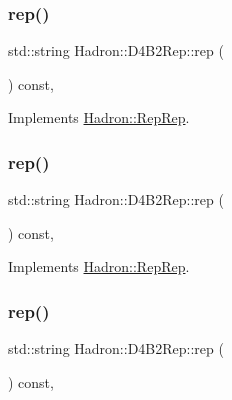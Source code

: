 \subsubsection{\texorpdfstring{rep()}{rep()}\hspace{0.1cm}{\footnotesize\ttfamily [3/5]}}
{\footnotesize\ttfamily std\+::string Hadron\+::\+D4\+B2\+Rep\+::rep (\begin{DoxyParamCaption}{ }\end{DoxyParamCaption}) const\hspace{0.3cm}{\ttfamily [inline]}, {\ttfamily [virtual]}}



Implements \mbox{\hyperlink{structHadron_1_1RepRep_ab3213025f6de249f7095892109575fde}{Hadron\+::\+Rep\+Rep}}.

\mbox{\label{structHadron_1_1D4B2Rep_ac78aafe72fe015abb9639b5c380be490}} 
\subsubsection{\texorpdfstring{rep()}{rep()}\hspace{0.1cm}{\footnotesize\ttfamily [4/5]}}
{\footnotesize\ttfamily std\+::string Hadron\+::\+D4\+B2\+Rep\+::rep (\begin{DoxyParamCaption}{ }\end{DoxyParamCaption}) const\hspace{0.3cm}{\ttfamily [inline]}, {\ttfamily [virtual]}}



Implements \mbox{\hyperlink{structHadron_1_1RepRep_ab3213025f6de249f7095892109575fde}{Hadron\+::\+Rep\+Rep}}.

\mbox{\label{structHadron_1_1D4B2Rep_ac78aafe72fe015abb9639b5c380be490}} 
\subsubsection{\texorpdfstring{rep()}{rep()}\hspace{0.1cm}{\footnotesize\ttfamily [5/5]}}
{\footnotesize\ttfamily std\+::string Hadron\+::\+D4\+B2\+Rep\+::rep (\begin{DoxyParamCaption}{ }\end{DoxyParamCaption}) const\hspace{0.3cm}{\ttfamily [inline]}, {\ttfamily [virtual]}}



